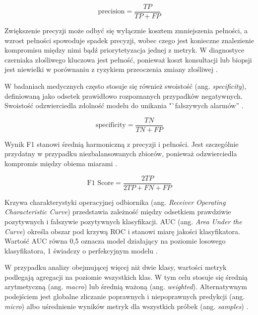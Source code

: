 \begin{equation}
	\text{precision}=\frac{TP}{TP+FP}
\end{equation}

Zwiększenie precyzji może odbyć się wyłącznie kosztem zmniejszenia pełności, a wzrost pełności spowoduje spadek precyzji, wobec czego jest konieczne znalezienie kompromisu między nimi bądź priorytetyzacja jednej z metryk.
W diagnostyce czerniaka złośliwego kluczowa jest pełność, ponieważ koszt konsultacji lub biopsji jest niewielki w porównaniu z ryzykiem przeoczenia zmiany złośliwej \cite{Rainio_2024, Grandini_Bagli_Visani_2020, Nowak_2022}.

W badaniach medycznych często stosuje się również swoistość (ang. \textit{specificity}), definiowaną jako odsetek prawidłowo rozpoznanych przypadków negatywnych.
Swoistość odzwierciedla zdolność modelu do unikania "`fałszywych alarmów'' \cite{Rainio_2024}. 

\begin{equation}
	\text{specificity}=\frac{TN}{TN+FP}
\end{equation}

Wynik F1 stanowi średnią harmoniczną z precyzji i pełności.
Jest szczególnie przydatny w przypadku niezbalansowanych zbiorów, ponieważ odzwierciedla kompromis między obiema miarami \cite{Rainio_2024, Erickson_Kitamura_2021, Nowak_2022}.

\begin{equation}
	\text{F1 Score}=\frac{2TP}{2TP+FN+FP}
\end{equation}

Krzywa charakterystyki operacyjnej odbiornika (ang. \textit{Receiver Operating Characteristic Curve}) przedstawia zależność między odsetkiem prawdziwie pozytywnych i fałszywie pozytywnych klasyfikacji.
AUC (ang. \textit{Area Under the Curve}) określa obszar pod krzywą ROC i stanowi miarę jakości klasyfikatora. 
Wartość AUC równa 0,5 oznacza model działający na poziomie losowego klasyfikatora, 1 świadczy o perfekcyjnym modelu \cite{Erickson_Kitamura_2021}.

W przypadku analizy obejmującej więcej niż dwie klasy, wartości metryk podlegają agregacji na poziomie wszystkich klas.
W tym celu stosuje się średnią arytmetyczną (ang. \textit{macro}) lub średnią ważoną (ang. \textit{weighted}).
Alternatywnym podejściem jest globalne zliczanie poprawnych i niepoprawnych predykcji (ang. \textit{micro}) albo uśrednienie wyników metryk dla wszystkich próbek (ang. \textit{samples}) \cite{Nowak_2022}.


